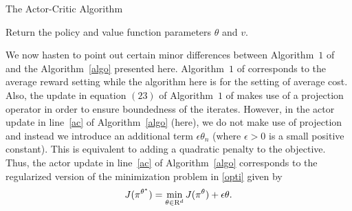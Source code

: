 \begin{algorithm}[H]
\begin{algorithmic}[1]
\caption{The Actor-Critic Algorithm}
\label{algo}
\label{ac}
\ENDFOR
\STATE Return the policy and value function parameters $\theta$ and $v$.
\end{algorithmic}
\end{algorithm}
\begin{remark}
We now hasten to point out certain minor differences between Algorithm~$1$ of \cite{NAC} and the
Algorithm~\ref{algo} presented here. Algorithm~$1$ of \cite{NAC} corresponds to the average reward setting
while the algorithm here is for the setting of average cost. Also, the update in equation $(23)$ of 
Algorithm~$1$ of \cite{NAC} makes use of a projection operator in order to ensure boundedness of the 
iterates. However, in the actor update in line~\ref{ac} of Algorithm~\ref{algo} (here),
we do not make use of projection and instead we introduce an additional term $\epsilon \theta_n$ 
(where $\epsilon >0$ is a small positive constant). This is equivalent to adding a quadratic penalty to 
the objective. Thus, the actor update in line~\ref{ac} of Algorithm~\ref{algo} corresponds to the regularized version of the minimization problem in \eqref{opti} given by
\begin{align}\label{optireg}
J(\pi^{\theta^*})=\min_{\theta \in \mathrm{R}^d} J(\pi^\theta)+\epsilon \theta.
\end{align}
\end{remark}

